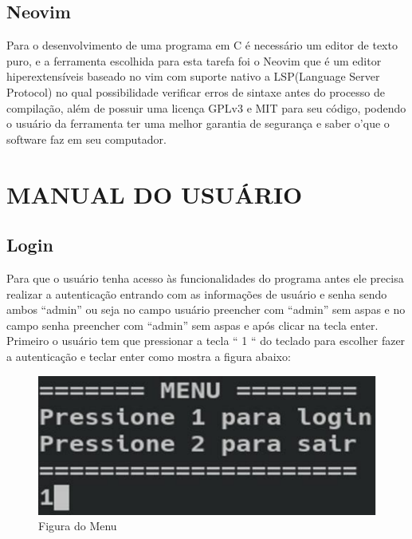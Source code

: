 \documentclass[
	12pt,				%
	oneside,			%
	a4paper,			%
  section=TITLE,
	brazil,				%
	]{abntex2}
\begin{document}
\subsection{Neovim}

Para o desenvolvimento de uma programa em C é necessário um editor de texto
puro, e a ferramenta escolhida para esta tarefa foi o Neovim que é um editor
hiperextensíveis baseado no vim com suporte nativo a LSP(Language Server
Protocol) no qual possibilidade verificar erros de sintaxe antes do processo de
compilação, além de possuir uma licença GPLv3 e MIT para seu código, podendo o
usuário da ferramenta ter uma melhor garantia de segurança e saber o'que o
software faz em seu computador.


\section{MANUAL DO USUÁRIO}

\subsection{Login}

Para que o usuário tenha acesso às funcionalidades do programa antes ele
precisa realizar a autenticação entrando com as informações de usuário e senha
sendo ambos “admin” ou seja no campo usuário preencher com “admin” sem aspas e
no campo senha preencher com “admin” sem aspas e após clicar na tecla enter.
Primeiro o usuário tem que pressionar a tecla “ 1 “ do teclado para escolher
fazer a autenticação e teclar enter como mostra a figura abaixo:

\begin{figure}[htb]
\caption{\label{fig_user_menu}Figura do Menu}
\begin{center}
  \includegraphics[scale=3.00]{img/user-menu.png}
\end{center}
\end{figure}
\end{document}
